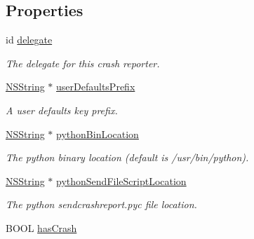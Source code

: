 \subsection*{Properties}
\begin{DoxyCompactItemize}
\item 
\hypertarget{interface_g_d_crash_reporter_a68faa785ab392fd266eb182464f974cf}{
id \hyperlink{interface_g_d_crash_reporter_a68faa785ab392fd266eb182464f974cf}{delegate}}
\label{interface_g_d_crash_reporter_a68faa785ab392fd266eb182464f974cf}

\begin{DoxyCompactList}\small\item\em The delegate for this crash reporter. \item\end{DoxyCompactList}\item 
\hyperlink{class_n_s_string}{NSString} $\ast$ \hyperlink{interface_g_d_crash_reporter_a4d6febfc475539bfbde40d2662abaad7}{userDefaultsPrefix}
\begin{DoxyCompactList}\small\item\em A user defaults key prefix. \item\end{DoxyCompactList}\item 
\hypertarget{interface_g_d_crash_reporter_aac4ef6432c30deadb25a7b8bbecc936e}{
\hyperlink{class_n_s_string}{NSString} $\ast$ \hyperlink{interface_g_d_crash_reporter_aac4ef6432c30deadb25a7b8bbecc936e}{pythonBinLocation}}
\label{interface_g_d_crash_reporter_aac4ef6432c30deadb25a7b8bbecc936e}

\begin{DoxyCompactList}\small\item\em The python binary location (default is /usr/bin/python). \item\end{DoxyCompactList}\item 
\hyperlink{class_n_s_string}{NSString} $\ast$ \hyperlink{interface_g_d_crash_reporter_a1e124e291a81c89405432cdccffcbb15}{pythonSendFileScriptLocation}
\begin{DoxyCompactList}\small\item\em The python sendcrashreport.pyc file location. \item\end{DoxyCompactList}\item 
\hypertarget{interface_g_d_crash_reporter_aa466f07385578729c4edb249075e82e5}{
BOOL \hyperlink{interface_g_d_crash_reporter_aa466f07385578729c4edb249075e82e5}{hasCrash}}
\label{interface_g_d_crash_reporter_aa466f07385578729c4edb249075e82e5}


\end{DoxyCompactItemize}
